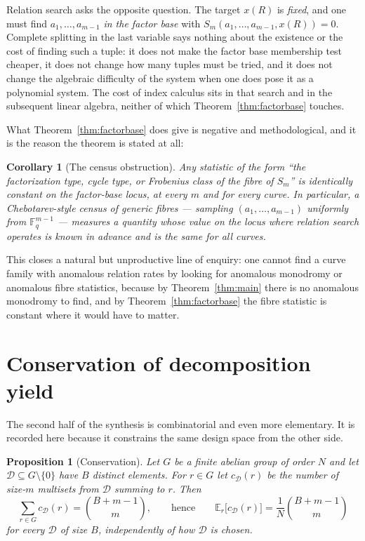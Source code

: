 \documentclass[11pt,a4paper]{article}
\theoremstyle{plain}
\newtheorem{proposition}[theorem]{Proposition}
\newtheorem{corollary}[theorem]{Corollary}
\theoremstyle{definition}
\newcommand{\FF}{\mathbb{F}}
\newcommand{\Fq}{\FF_q}
\begin{document}
Relation search asks the opposite question. The target $x(R)$ is \emph{fixed}, and
one must find $a_1,\dots,a_{m-1}$ \emph{in the factor base} with
$S_m(a_1,\dots,a_{m-1},x(R)) = 0$. Complete splitting in the last variable says
nothing about the existence or the cost of finding such a tuple: it does not make
the factor base membership test cheaper, it does not change how many tuples must
be tried, and it does not change the algebraic difficulty of the system when one
does pose it as a polynomial system. The cost of index calculus sits in that
search and in the subsequent linear algebra, neither of which
Theorem~\ref{thm:factorbase} touches.

What Theorem~\ref{thm:factorbase} does give is negative and methodological, and it
is the reason the theorem is stated at all:

\begin{corollary}[The census obstruction]\label{cor:census}
Any statistic of the form ``the factorization type, cycle type, or Frobenius
class of the fibre of $S_m$'' is \emph{identically constant} on the factor-base
locus, at every $m$ and for every curve. In particular, a Chebotarev-style census
of generic fibres --- sampling $(a_1,\dots,a_{m-1})$ uniformly from $\Fq^{m-1}$ ---
measures a quantity whose value on the locus where relation search operates is
known in advance and is the same for all curves.
\end{corollary}

This closes a natural but unproductive line of enquiry: one cannot find a curve
family with anomalous relation rates by looking for anomalous monodromy or
anomalous fibre statistics, because by Theorem~\ref{thm:main} there is no
anomalous monodromy to find, and by Theorem~\ref{thm:factorbase} the fibre
statistic is constant where it would have to matter.

\section{Conservation of decomposition yield}\label{sec:conservation}

The second half of the synthesis is combinatorial and even more elementary. It is
recorded here because it constrains the same design space from the other side.

\begin{proposition}[Conservation]\label{prop:conservation}
Let $G$ be a finite abelian group of order $N$ and let
$\mathcal{D} \subseteq G \setminus \{0\}$ have $B$ distinct elements. For
$r \in G$ let $c_{\mathcal{D}}(r)$ be the number of size-$m$ multisets from
$\mathcal{D}$ summing to $r$. Then
\[
  \sum_{r \in G} c_{\mathcal{D}}(r) = \binom{B+m-1}{m},
  \qquad\text{hence}\qquad
  \mathbb{E}_{r}\bigl[ c_{\mathcal{D}}(r) \bigr] = \frac{1}{N}\binom{B+m-1}{m}
\]
for \emph{every} $\mathcal{D}$ of size $B$, independently of how $\mathcal{D}$ is
chosen.
\end{proposition}
\end{document}
